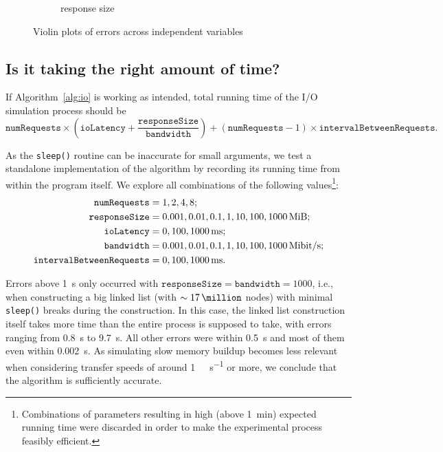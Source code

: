 \documentclass{article}
\begin{document}
\begin{figure}
\begin{subfigure}[t]{0.49\textwidth}
    \caption{response size}
    \label{fig:posterior_violin_response}
  \end{subfigure}
  \caption{Violin plots of errors across independent variables}
  \label{fig:posterior_violins}
\end{figure}

\subsection{Is it taking the right amount of time?}

If Algorithm~\ref{alg:io} is working as intended, total running time of the I/O
simulation process should be
\[
  \texttt{numRequests} \times \left( \texttt{ioLatency} +
  \frac{\texttt{responseSize}}{\texttt{bandwidth}} \right) +
(\texttt{numRequests} - 1) \times \texttt{intervalBetweenRequests}.
\]

As the \texttt{sleep()} routine can be inaccurate for small arguments, we test
a standalone implementation of the algorithm by recording its running time from
within the program itself. We explore all combinations of the following
values\footnote{Combinations of parameters resulting in high (above
  \SI{1}{\minute}) expected running time were discarded in order to make the
  experimental process feasibly efficient.}:
\begin{align*}
  \texttt{numRequests} &= 1, 2, 4, 8; \\
  \texttt{responseSize} &= 0.001, 0.01, 0.1, 1, 10, 100, \SI{1000}{\mebi\byte}; \\
  \texttt{ioLatency} &= 0, 100, \SI{1000}{\milli\second}; \\
  \texttt{bandwidth} &= 0.001, 0.01, 0.1, 1, 10, 100, \SI[per-mode=symbol]{1000}{\mebi\bit\per\second}; \\
  \texttt{intervalBetweenRequests} &= 0, 100, \SI{1000}{\milli\second}.
\end{align*}

Errors above \SI{1}{\second} only occurred with $\texttt{responseSize} =
\texttt{bandwidth} = 1000$, i.e., when constructing a big linked list (with
$\sim \SI{17}{\million}$ nodes) with minimal \texttt{sleep()} breaks during the
construction. In this case, the linked list construction itself takes more
time than the entire process is supposed to take, with errors ranging from
\SI{0.8}{\second} to \SI{9.7}{\second}. All other errors were within
\SI{0.5}{\second} and most of them even within \SI{0.002}{\second}. As
simulating slow memory buildup becomes less relevant when considering transfer
speeds of around \SI[per-mode=symbol]{1}{\gibi\bit\per\second} or more, we
conclude that the algorithm is sufficiently accurate.
\end{document}
